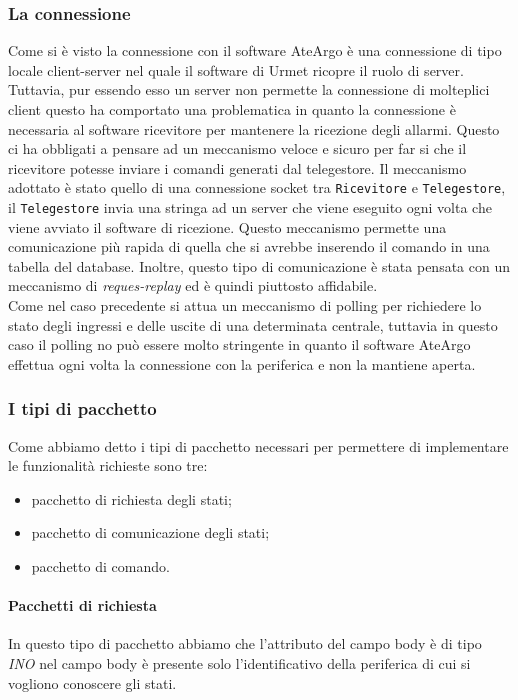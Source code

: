 \subsubsection{La connessione}
Come si è visto la connessione con il software AteArgo è una connessione di tipo locale client-server nel quale il software di Urmet ricopre il ruolo di server. Tuttavia, pur essendo esso un server non permette la connessione di molteplici client questo ha comportato una problematica in quanto la connessione è necessaria al software ricevitore per mantenere la ricezione degli allarmi. Questo ci ha obbligati a pensare ad un meccanismo veloce e sicuro per far si che il ricevitore potesse inviare i comandi generati dal telegestore. Il meccanismo adottato è stato quello di una connessione socket tra \texttt{Ricevitore} e \texttt{Telegestore}, il \texttt{Telegestore} invia una stringa ad un server che viene eseguito ogni volta che viene avviato il software di ricezione. Questo meccanismo permette una comunicazione più rapida di quella che si avrebbe inserendo il comando in una tabella del database. 
Inoltre, questo tipo di comunicazione è stata pensata con un meccanismo di \emph{reques-replay} ed è quindi piuttosto affidabile.\\
Come nel caso precedente si attua un meccanismo di polling per richiedere lo stato degli ingressi e delle uscite di una determinata centrale, tuttavia in questo caso il polling no può essere molto stringente in quanto il software AteArgo effettua ogni volta la connessione con la periferica e non la mantiene aperta.
\subsubsection{I tipi di pacchetto}
Come abbiamo detto i tipi di pacchetto necessari per permettere di implementare le funzionalità richieste sono tre:
\begin{itemize}
	\item pacchetto di richiesta degli stati;
	\item pacchetto di comunicazione degli stati;
	\item pacchetto di comando.
\end{itemize}
\paragraph{Pacchetti di richiesta}
In questo tipo di pacchetto abbiamo che l'attributo del campo body è di tipo \emph{INO} nel campo body è presente solo l'identificativo della periferica di cui si vogliono conoscere gli stati.
